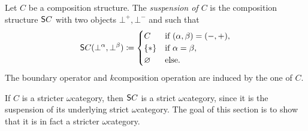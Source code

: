 \begin{dfn} [Suspension]
    Let \( C \) be a composition structure.
    The \emph{suspension of \( C \)} is the composition structure \( \mathsf{S}{C} \) with two objects \( \bot^+, \bot^- \) and such that
    \begin{equation*}
        \mathsf{S}{C}(\bot^\alpha, \bot^\beta) \coloneqq 
        \begin{cases}
            C       & \text{if } (\alpha, \beta) = (-, +),\\
            \left\{ {*} \right\} & \text{if } \alpha = \beta,\\
            \varnothing & \text{else.}
        \end{cases}
    \end{equation*}
    The boundary operator and \( k \)\nbd composition operation are induced by the one of \( C \). 
\end{dfn}

\noindent If \( C \) is a stricter \( \omega \)\nbd category, then \( \mathsf{S}{C} \) is a strict \( \omega \)\nbd category, since it is the suspension of its underlying strict \( \omega \)\nbd category.
The goal of this section is to show that it is in fact a stricter \( \omega \)\nbd category. 

